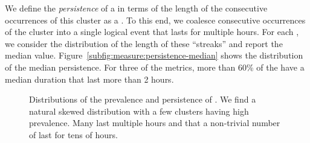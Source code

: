 We define the \emph{persistence} of a \problemcluster in terms 
of the length of the consecutive occurrences of this cluster as a
\problemcluster.  
To this end, we coalesce consecutive occurrences of the cluster 
into a single logical event that lasts for multiple hours. 
For each \problemcluster, we  consider the distribution of the 
length of these ``streaks'' and report the median value.
Figure~\ref{subfig:measure:persistence-median} shows 
the distribution of the median persistence. 
For three of the metrics, more than 60\% of the \problemclusters 
have a median duration that last more than 2 hours.



\begin{figure}[t]
\centering
\captionsetup[subfigure]{justification=centering,farskip=-1pt,captionskip=5pt}
\caption{Distributions of the prevalence and persistence of  \problemclusters.
We find a natural skewed distribution with a few 
 clusters having high prevalence. 
 Many \problemclusters last multiple hours and that a non-trivial 
 number of \problemclusters last for tens of hours.}
\label{fig:}
\end{figure}

